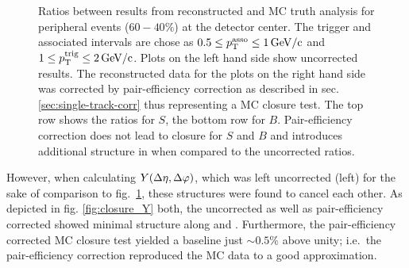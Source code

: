 \begin{figure}
\begin{subfigure}[b]{0.5\textwidth}
  \end{subfigure}
  \caption[Ratios between results from reconstructed and MC truth analysis for peripheral events ($60-40\%$) at the detector center.]{Ratios between results from reconstructed and MC truth analysis for peripheral events ($60-40\%$) at the detector center. The trigger and associated intervals are chose as $0.5 \le p_{\text{T}}^{\text{asso}} \le \SI{1}{GeV/c}$ and $1 \le p_{\text{T}}^{\text{trig}} \le \SI{2}{GeV/c}$. Plots on the left hand side show uncorrected results. The reconstructed data for the plots on the right hand side was corrected by pair-efficiency correction as described in sec. \ref{sec:single-track-corr} thus representing a MC closure test. The top row shows the ratios for $S$, the bottom row for $B$. Pair-efficiency correction does not lead to closure for $S$ and $B$ and introduces additional structure in \dphi when compared to the uncorrected ratios.}
  \label{fig:closures}
\end{figure}

However, when calculating $Y(\Delta\eta, \Delta\varphi)$, which was left uncorrected (left) for the sake of comparison to fig.~\ref{fig:closures},  these structures were found to cancel each other. As depicted in fig. \ref{fig:closure_Y} both, the uncorrected as well as pair-efficiency corrected \Y showed minimal structure along \deta and \dphi. Furthermore, the pair-efficiency corrected MC closure test yielded a baseline just $\sim 0.5\%$ above unity; i.e.\ the pair-efficiency correction reproduced the MC data to a good approximation.

